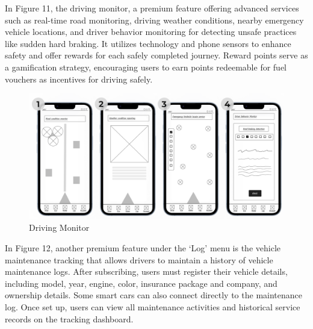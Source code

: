 \documentclass[12pt,a4paper]{article}
\begin{document}
\noindent In Figure 11, the driving monitor, a premium feature offering advanced services such as real-time road monitoring, driving weather conditions, nearby emergency vehicle locations, and driver behavior monitoring for detecting unsafe practices like sudden hard braking. It utilizes technology and phone sensors to enhance safety and offer rewards for each safely completed journey. Reward points serve as a gamification strategy, encouraging users to earn points redeemable for fuel vouchers as incentives for driving safely.\\
\begin{figure}[h]
    \centering
    \includegraphics[width=0.8
    \textwidth]{images/Prototype Figures/Prototype Figure 6.png}
    \caption{Driving Monitor}
    \label{fig:example}
\end{figure}




\noindent In Figure 12, another premium feature under the `Log' menu is the vehicle maintenance tracking that allows drivers to maintain a history of vehicle maintenance logs. After subscribing, users must register their vehicle details, including model, year, engine, color, insurance package and company, and ownership details. Some smart cars can also connect directly to the maintenance log. Once set up, users can view all maintenance activities and historical service records on the tracking dashboard.\\

\pagebreak
\end{document}
